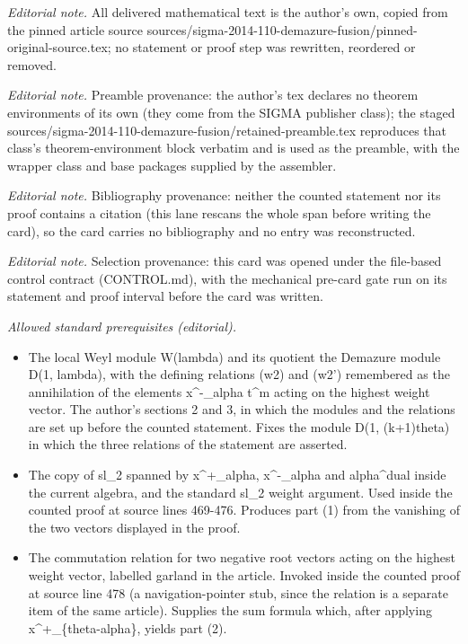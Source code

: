 \documentclass[10pt,a4paper]{amsart}
\begin{document}
\noindent\textit{Editorial note.} All delivered mathematical text is the author's own, copied from the pinned article source sources/sigma-2014-110-demazure-fusion/pinned-original-source.tex; no statement or proof step was rewritten, reordered or removed.\par\medskip
\noindent\textit{Editorial note.} Preamble provenance: the author's tex declares no theorem environments of its own (they come from the SIGMA publisher class); the staged sources/sigma-2014-110-demazure-fusion/retained-preamble.tex reproduces that class's theorem-environment block verbatim and is used as the preamble, with the wrapper class and base packages supplied by the assembler.\par\medskip
\noindent\textit{Editorial note.} Bibliography provenance: neither the counted statement nor its proof contains a citation (this lane rescans the whole span before writing the card), so the card carries no bibliography and no entry was reconstructed.\par\medskip
\noindent\textit{Editorial note.} Selection provenance: this card was opened under the file-based control contract (CONTROL.md), with the mechanical pre-card gate run on its statement and proof interval before the card was written.\par\medskip
\noindent\textit{Allowed standard prerequisites (editorial).}\begin{itemize}
\item The local Weyl module W(lambda) and its quotient the Demazure module D(1, lambda), with the defining relations (w2) and (w2') remembered as the annihilation of the elements x\textasciicircum{}-\_alpha t\textasciicircum{}m acting on the highest weight vector. The author's sections 2 and 3, in which the modules and the relations are set up before the counted statement. Fixes the module D(1, (k+1)theta) in which the three relations of the statement are asserted.
\item The copy of sl\_2 spanned by x\textasciicircum{}+\_alpha, x\textasciicircum{}-\_alpha and alpha\textasciicircum{}dual inside the current algebra, and the standard sl\_2 weight argument. Used inside the counted proof at source lines 469-476. Produces part (1) from the vanishing of the two vectors displayed in the proof.
\item The commutation relation for two negative root vectors acting on the highest weight vector, labelled garland in the article. Invoked inside the counted proof at source line 478 (a navigation-pointer stub, since the relation is a separate item of the same article). Supplies the sum formula which, after applying x\textasciicircum{}+\_\{theta-alpha\}, yields part (2).
\end{itemize}\medskip
\end{document}
